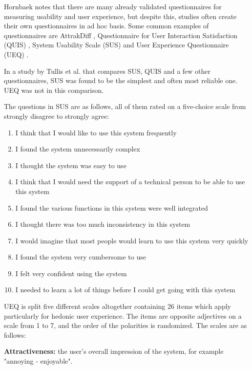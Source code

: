 Hornbaek notes that there are many already validated questionnaires for measuring usability and user experience, but despite this, studies often create their own questionnaires in ad hoc basis. \cite{hornbaek2006current} Some common examples of questionnaires are AttrakDiff \cite{hassenzahl2003attrakdiff}, Questionnaire for User Interaction Satisfaction (QUIS) \cite{chin1988questionnaire}, System Usability Scale (SUS) \cite{brooke1996sus} and User Experience Questionnaire (UEQ) \cite{laugwitz2008construction}.

In a study by Tullis et al. that compares SUS, QUIS and a few other questionnaires, SUS was found to be the simplest and often most reliable one. UEQ was not in this comparison. \cite{tullis2004comparison}

The questions in SUS are as follows, all of them rated on a five-choice scale from strongly disagree to strongly agree:

\begin{enumerate}
\item I think that I would like to use this system frequently
\item I found the system unnecessarily complex
\item I thought the system was easy to use                      
\item I think that I would need the support of a technical person to be able to use this system
\item I found the various functions in this system were well integrated
\item I thought there was too much inconsistency in this system
\item I would imagine that most people would learn to use this system very quickly
\item I found the system very cumbersome to use
\item I felt very confident using the system
\item I needed to learn a lot of things before I could get going with this system 
\end{enumerate}

\cite{brooke1996sus}

UEQ is split five different scales altogether containing 26 items which apply particularly for hedonic user experience. The items are opposite adjectives on a scale from 1 to 7, and the order of the polarities is randomized. The scales are as follows:

\textbf{Attractiveness:} the user's overall impression of the system, for example "annoying - enjoyable".

